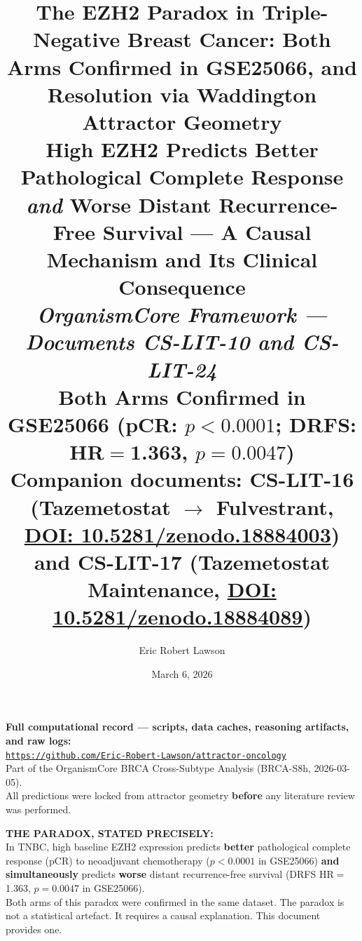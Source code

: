 \documentclass[12pt, a4paper]{article}
\title{
    \vspace{-1em}
    \textbf{The EZH2 Paradox in Triple-Negative Breast
    Cancer: Both Arms Confirmed in GSE25066, and
    Resolution via Waddington Attractor Geometry}\\[0.5em]
    \large High EZH2 Predicts Better Pathological
    Complete Response \textit{and} Worse Distant
    Recurrence-Free Survival — A Causal Mechanism
    and Its Clinical Consequence\\[0.4em]
    \normalsize \textit{OrganismCore Framework ---
    Documents CS-LIT-10 and CS-LIT-24}\\[0.3em]
    \small Both Arms Confirmed in GSE25066
    (pCR: $p < 0.0001$; DRFS: HR$=$1.363,
    $p = 0.0047$)\\[0.3em]
    \small Companion documents: CS-LIT-16
    (Tazemetostat $\rightarrow$ Fulvestrant,
    \href{https://doi.org/10.5281/zenodo.18884003}
    {DOI: 10.5281/zenodo.18884003}) and CS-LIT-17
    (Tazemetostat Maintenance,
    \href{https://doi.org/10.5281/zenodo.18884089}
    {DOI: 10.5281/zenodo.18884089})
}
\author[1]{Eric Robert Lawson}
\affil[1]{
    OrganismCore\\
    \href{mailto:OrganismCore@proton.me}
         {OrganismCore@proton.me}\\
    ORCID:
    \href{https://orcid.org/0009-0002-0414-6544}
         {0009-0002-0414-6544}
}
\date{March 6, 2026}
\begin{document}

\maketitle
\thispagestyle{fancy}

\begin{center}
\colorbox{repobox}{
\begin{minipage}{0.88\textwidth}
\vspace{0.5em}
\centering
\textbf{Full computational record --- scripts, data
caches, reasoning artifacts, and raw logs:}\\[0.4em]
\href{https://github.com/Eric-Robert-Lawson/attractor-oncology}
{\texttt{https://github.com/Eric-Robert-Lawson/attractor-oncology}}
\\[0.3em]
\small Part of the OrganismCore BRCA Cross-Subtype
Analysis (BRCA-S8h, 2026-03-05).\\
All predictions were locked from attractor geometry
\textbf{before} any literature review was performed.
\vspace{0.5em}
\end{minipage}}
\end{center}

\vspace{1em}

\begin{center}
\colorbox{paradoxbox}{
\begin{minipage}{0.88\textwidth}
\vspace{0.5em}
\textbf{THE PARADOX, STATED PRECISELY:}\\[0.4em]
In TNBC, high baseline EZH2 expression predicts
\textbf{better} pathological complete response (pCR)
to neoadjuvant chemotherapy ($p < 0.0001$ in GSE25066)
\textbf{and simultaneously} predicts \textbf{worse}
distant recurrence-free survival (DRFS HR$=$1.363,
$p = 0.0047$ in GSE25066).\\[0.4em]
Both arms of this paradox were confirmed in the same
dataset. The paradox is not a statistical artefact.
It requires a causal explanation. This document
provides one.
\vspace{0.5em}
\end{minipage}}
\end{center}

\vspace{1em}
\end{document}
